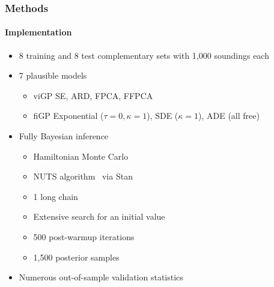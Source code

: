 \documentclass{snedecorbeamer}
\begin{document}
\begin{frame}
  \frametitle{Methods}
  \framesubtitle{Implementation}

  \begin{itemize}
  \item 8 training and 8 test complementary sets with 1,000 soundings each
  \item 7 plausible models
    \begin{itemize}
    \item viGP SE, ARD, FPCA, FFPCA
    \item fiGP Exponential ($\tau=0,\kappa=1$), SDE ($\kappa=1$), ADE (all free)
    \end{itemize}
  \item
    \hyperlink{frm:inference}{}
    Fully Bayesian inference
    \begin{itemize}
    \item Hamiltonian Monte Carlo~\cite[ch. 5]{brooks2011}
    \item NUTS algorithm~\cite{hoffman2014} via
      Stan~\cite{standevelopmentteam2021}
    \item 1 long chain~\cite{raftery1992}
    \item Extensive search for an initial value
    \item 500 post-warmup iterations
    \item 1,500 posterior samples
    \end{itemize}
  \item \hyperlink{frm:validation}{}
    Numerous out-of-sample validation statistics
  \end{itemize}
\end{frame}
\end{document}
